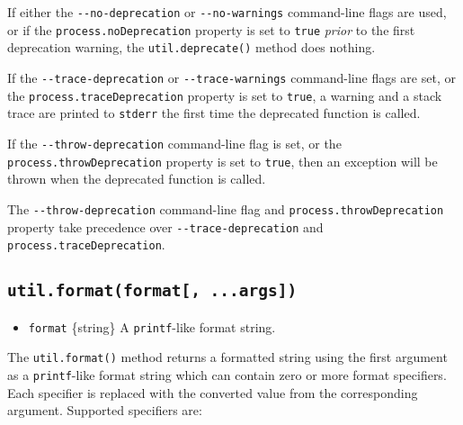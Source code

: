 If either the \texttt{-\/-no-deprecation} or \texttt{-\/-no-warnings}
command-line flags are used, or if the \texttt{process.noDeprecation}
property is set to \texttt{true} \emph{prior} to the first deprecation
warning, the \texttt{util.deprecate()} method does nothing.

If the \texttt{-\/-trace-deprecation} or \texttt{-\/-trace-warnings}
command-line flags are set, or the \texttt{process.traceDeprecation}
property is set to \texttt{true}, a warning and a stack trace are
printed to \texttt{stderr} the first time the deprecated function is
called.

If the \texttt{-\/-throw-deprecation} command-line flag is set, or the
\texttt{process.throwDeprecation} property is set to \texttt{true}, then
an exception will be thrown when the deprecated function is called.

The \texttt{-\/-throw-deprecation} command-line flag and
\texttt{process.throwDeprecation} property take precedence over
\texttt{-\/-trace-deprecation} and \texttt{process.traceDeprecation}.

\subsection{\texorpdfstring{\texttt{util.format(format{[},\ ...args{]})}}{util.format(format{[}, ...args{]})}}\label{util.formatformat-...args}

\begin{itemize}
\tightlist
\item
  \texttt{format} \{string\} A \texttt{printf}-like format string.
\end{itemize}

The \texttt{util.format()} method returns a formatted string using the
first argument as a \texttt{printf}-like format string which can contain
zero or more format specifiers. Each specifier is replaced with the
converted value from the corresponding argument. Supported specifiers
are:

